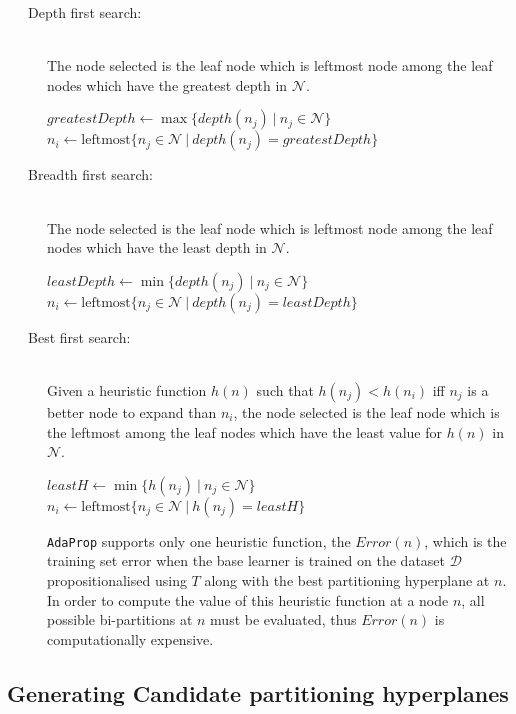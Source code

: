 \documentclass[a4paper,12pt]{report} %
\newcommand{\AdaProp}{\texttt{AdaProp}\xspace}
\newcommand{\mcl}[1]{\mathcal{#1}}
\begin{document}
\begin{description}
\item[~~~Depth first search:] \ \\
    The node selected is the leaf node 
    which is leftmost node among 
    the leaf nodes which have the greatest depth
    in $\mcl{N}$.
\begin{algorithmic}
    \State $ greatestDepth \gets \max\{ depth(n_j) ~\big|~ n_j \in \mcl{N} \} $
    \State $ n_i \gets \textrm{leftmost}\{ n_j \in \mcl{N} ~\big|~ depth(n_j) = greatestDepth \} $
\end{algorithmic}
        
\item[~~~Breadth first search:] \ \\
    The node selected is the leaf node 
    which is leftmost node among 
    the leaf nodes which have the least depth
    in $\mcl{N}$.
\begin{algorithmic}
    \State $ leastDepth \gets \min\{ depth(n_j) ~\big|~ n_j \in \mcl{N} \} $
    \State $ n_i \gets \textrm{leftmost}\{ n_j \in \mcl{N} ~\big|~ depth(n_j) = leastDepth \} $
\end{algorithmic}
    
\item[~~~Best first search:] \ \\
    Given a heuristic function $h(n)$ such that
    $h(n_j) < h(n_i)$ iff $n_j$ is a better node to expand than $n_i$,
    the node selected is the leaf node 
    which is the leftmost among 
    the leaf nodes which have the least value for $h(n)$
    in $\mcl{N}$.
\begin{algorithmic}
    \State $ leastH \gets \min\{ h(n_j) ~\big|~ n_j \in \mcl{N} \} $
    \State $ n_i \gets \textrm{leftmost}\{ n_j \in \mcl{N} ~\big|~ h(n_j) = leastH \} $
\end{algorithmic}

    \AdaProp supports only one heuristic function, 
        the $Error(n)$, which is the training set error 
        when the base learner is trained on the dataset $\mcl{D}$
        propositionalised using $T$ along with 
        the best partitioning hyperplane at $n$.
     In order to compute the value of this heuristic function at a node $n$,
         all possible bi-partitions at $n$ must be evaluated,
         thus $Error(n)$ is computationally expensive.
    
\end{description}

\subsection{Generating Candidate partitioning hyperplanes}
\label{secCandGen}
\end{document}
